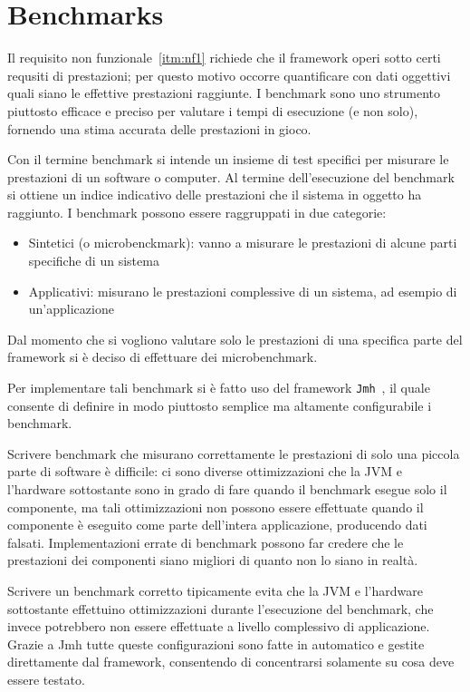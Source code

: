 \section{Benchmarks}\label{sec:benchmarks}
Il requisito non funzionale~\ref{itm:nf1} richiede che il framework operi sotto certi requsiti di prestazioni;
per questo motivo occorre quantificare con dati oggettivi quali siano le effettive prestazioni raggiunte.
I benchmark sono uno strumento piuttosto efficace e preciso per valutare i tempi di esecuzione (e non solo), fornendo
una stima accurata delle prestazioni in gioco.

Con il termine benchmark si intende un insieme di test specifici per misurare le prestazioni di un software o computer.
Al termine dell'esecuzione del benchmark si ottiene un indice indicativo delle prestazioni che il sistema in oggetto ha
raggiunto.
I benchmark possono essere raggruppati in due categorie:
\begin{itemize}
    \item Sintetici (o microbenckmark): vanno a misurare le prestazioni di alcune parti specifiche di un sistema
    \item Applicativi: misurano le prestazioni complessive di un sistema, ad esempio di un'applicazione
\end{itemize}

Dal momento che si vogliono valutare solo le prestazioni di una specifica parte del framework si è deciso di effettuare
dei microbenchmark.

Per implementare tali benchmark si è fatto uso del framework \texttt{Jmh}~\cite{jmh}, il quale consente di definire in
modo piuttosto semplice ma altamente configurabile i benchmark.

Scrivere benchmark che misurano correttamente le prestazioni di solo una piccola parte di software è difficile: ci sono
diverse ottimizzazioni che la JVM e l'hardware sottostante sono in grado di fare quando il benchmark esegue solo il
componente, ma tali ottimizzazioni non possono essere effettuate quando il componente è eseguito come parte dell'intera
applicazione, producendo dati falsati.
Implementazioni errate di benchmark possono far credere che le prestazioni dei componenti siano migliori di quanto non
lo siano in realtà.

Scrivere un benchmark corretto tipicamente evita che la JVM e l'hardware sottostante effettuino ottimizzazioni
durante l'esecuzione del benchmark, che invece potrebbero non essere effettuate a livello complessivo di
applicazione.
Grazie a Jmh tutte queste configurazioni sono fatte in automatico e gestite direttamente dal framework, consentendo di
concentrarsi solamente su cosa deve essere testato.

